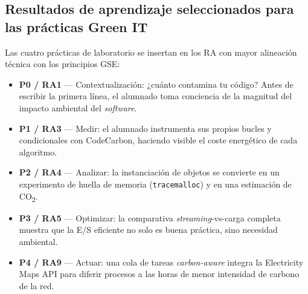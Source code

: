 \subsection{Resultados de aprendizaje seleccionados para las prácticas Green IT}


Las cuatro prácticas de laboratorio se insertan en los RA con mayor alineación técnica con los principios GSE:

\begin{itemize}
  \item \textbf{P0 / RA1} — Contextualización: ¿cuánto contamina tu código? Antes de escribir la primera línea, el alumnado toma conciencia de la magnitud del impacto ambiental del \textit{software}.
  \item \textbf{P1 / RA3} — Medir: el alumnado instrumenta sus propios bucles y condicionales con CodeCarbon, haciendo visible el coste energético de cada algoritmo.
  \item \textbf{P2 / RA4} — Analizar: la instanciación de objetos se convierte en un experimento de huella de memoria (\texttt{tracemalloc}) y en una estimación de CO\textsubscript{2}.
  \item \textbf{P3 / RA5} — Optimizar: la comparativa \textit{streaming}-vs-carga completa muestra que la E/S eficiente no solo es buena práctica, sino necesidad ambiental.
  \item \textbf{P4 / RA9} — Actuar: una cola de tareas \textit{carbon-aware} integra la Electricity Maps API para diferir procesos a las horas de menor intensidad de carbono de la red.
\end{itemize}






